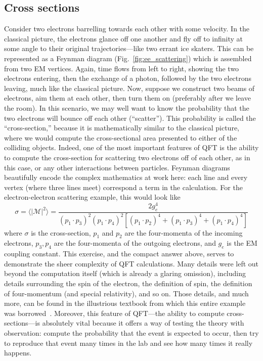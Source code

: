 \subsection{Cross sections}
Consider two electrons barrelling towards each other with some velocity. 
In the classical picture, the electrons glance off one another and fly off to infinity at some angle to their original trajectories---like two errant ice skaters. 
This can be represented as a Feynman diagram (Fig.~\ref{fig:ee_scattering}) which is assembled from two EM vertices. 
Again, time flows from left to right, showing the two electrons entering, then the exchange of a photon, followed by the two electrons leaving, much like the classical picture. 
Now, suppose we construct two beams of electrons, aim them at each other, then turn them on (preferably after we leave the room). 
In this scenario, we may well want to know the probability that the two electrons will bounce off each other (``scatter''). 
This probability is called the ``cross-section,'' because it is mathematically similar to the classical picture\footnotemark{}, where we would compute the cross-sectional area presented to either of the colliding objects. 
Indeed, one of the most important features of QFT is the ability to compute the cross-section for scattering two electrons off of each other, as in this case, or any other interactions between particles. 
Feynman diagrams beautifully encode the complex mathematics at work here: each line and every vertex (where three lines meet) correspond a term in the calculation. 
For the electron-electron scattering example, this would look like
\begin{equation}
    \sigma = \langle|\mathcal{M}|^2\rangle = \frac{2g_e^4}{(p_1 \cdot p_3)^2(p_1 \cdot p_4)^2[(p_1 \cdot p_2)^4 + (p_1 \cdot p_3)^4 + (p_1 \cdot p_4)^4]}
\end{equation}
where $\sigma$ is the cross-section, $p_1$ and $p_2$ are the four-momenta of the incoming electrons, $p_3, p_4$ are the four-momenta of the outgoing electrons, and $g_e$ is the EM coupling constant. 
This exercise, and the compact answer above, serves to demonstrate the sheer complexity of QFT calculations. 
Many details were left out beyond the computation itself (which is already a glaring omission), including details surrounding the spin of the electron, the definition of spin, the definition of four-momentum (and special relativity), and so on. 
Those details, and much more, can be found in the illustrious textbook from which this entire example was borrowed~\cite{GriffithsParticle}. 
Moreover, this feature of QFT---the ability to compute cross-sections---is absolutely vital because it offers a way of testing the theory with observation: compute the probability that the event is expected to occur, then try to reproduce that event many times in the lab and see how many times it really happens. 

